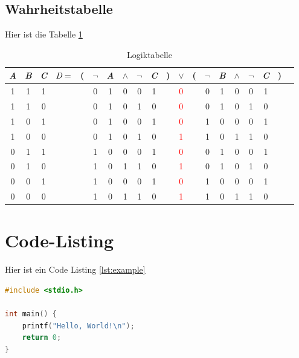 \documentclass{scrartcl}
\begin{document}
\subsection{Wahrheitstabelle}
Hier ist die Tabelle \ref{tab:IDK}
\noindent
\FloatBarrier
\begin{table}[ht]
    \centering
    \caption{Logiktabelle}
    \begin{tabular}{@{ }c@{ }@{ }c@{ }@{ }c | c@{ }@{}c@{}@{ }c@{ }@{ }c@{ }@{ }c@{ }@{ }c@{ }@{ }c@{ }@{}c@{}@{ }c@{ }@{}c@{}@{ }c@{ }@{ }c@{ }@{ }c@{ }@{ }c@{ }@{ }c@{ }@{}c@{}@{ }c}
        \emph{A} & \emph{B} & \emph{C} &  $\emph{D}=$ & ( & $\lnot$ & \emph{A} & $\land$ & $\lnot$ & \emph{C} & ) & $\lor$ & ( & $\lnot$ & \emph{B} & $\land$ & $\lnot$ & \emph{C} & ) & \\
        \hline 
        1 & 1 & 1 &  &  & 0 & 1 & 0 & 0 & 1 &  & \textcolor{red}{0} &  & 0 & 1 & 0 & 0 & 1 &  & \\
        1 & 1 & 0 &  &  & 0 & 1 & 0 & 1 & 0 &  & \textcolor{red}{0} &  & 0 & 1 & 0 & 1 & 0 &  & \\
        1 & 0 & 1 &  &  & 0 & 1 & 0 & 0 & 1 &  & \textcolor{red}{0} &  & 1 & 0 & 0 & 0 & 1 &  & \\
        1 & 0 & 0 &  &  & 0 & 1 & 0 & 1 & 0 &  & \textcolor{red}{1} &  & 1 & 0 & 1 & 1 & 0 &  & \\
        0 & 1 & 1 &  &  & 1 & 0 & 0 & 0 & 1 &  & \textcolor{red}{0} &  & 0 & 1 & 0 & 0 & 1 &  & \\
        0 & 1 & 0 &  &  & 1 & 0 & 1 & 1 & 0 &  & \textcolor{red}{1} &  & 0 & 1 & 0 & 1 & 0 &  & \\
        0 & 0 & 1 &  &  & 1 & 0 & 0 & 0 & 1 &  & \textcolor{red}{0} &  & 1 & 0 & 0 & 0 & 1 &  & \\
        0 & 0 & 0 &  &  & 1 & 0 & 1 & 1 & 0 &  & \textcolor{red}{1} &  & 1 & 0 & 1 & 1 & 0 &  & \\
    \end{tabular}
    \label{tab:IDK}
\end{table}
\FloatBarrier

\section{Code-Listing}
Hier ist ein Code Listing \ref{lst:example}
\begin{lstlisting}[language=C, caption={Beispielcode}, label=lst:example, breaklines=true, escapeinside='']
#include <stdio.h>

int main() {
    printf("Hello, World!\n");
    return 0;
}
\end{lstlisting}
\end{document}
